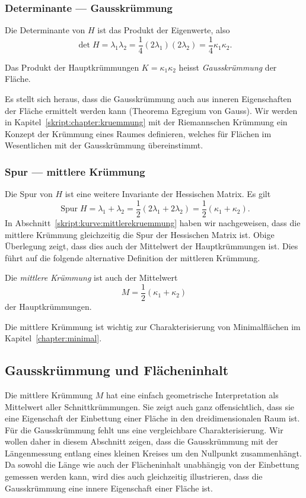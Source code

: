 \subsubsection{Determinante --- Gausskrümmung}
%
%
%
Die Determinante von $H$ ist das Produkt der Eigenwerte, also
\[
\det H
=
\lambda_1\lambda_2
=
\frac14 (2\lambda_1) (2\lambda_2)
=
\frac14 \kappa_1\kappa_2.
\]
\begin{definition}
\label{skript:definition:gausskruemmung}
Das Produkt der Hauptkrümmungen $K=\kappa_1\kappa_2$
heisst {\em Gausskrümmung} der Fläche.
\end{definition}
Es stellt sich heraus, dass die Gausskrümmung auch aus inneren Eigenschaften
der Fläche ermittelt werden kann
(Theorema Egregium von Gauss).
Wir werden in Kapitel~\ref{skript:chapter:kruemmung} 
mit der Riemannschen Krümmung ein Konzept der Krümmung eines Raumes
definieren, welches für Flächen im Wesentlichen mit der Gausskrümmung
übereinstimmt.

\subsubsection{Spur --- mittlere Krümmung}
%
%
%
Die Spur von $H$ ist eine weitere Invariante der Hessischen Matrix.
Es gilt
\[
\operatorname{Spur} H
=
\lambda_1+\lambda_2
=
\frac12(2\lambda_1+2\lambda_2)
=
\frac12(\kappa_1+\kappa_2).
\]
In Abschnitt~\ref{skript:kurve:mittlerekruemmung} haben wir nachgeweisen,
dass die mittlere Krümmung gleichzeitig die Spur der Hessischen Matrix ist.
Obige Überlegung zeigt, dass dies auch der Mittelwert der Hauptkrümmungen ist.
Dies führt auf die folgende alternative Definition der mittleren Krümmung.

\begin{definition}
\label{skript:definition:mittlerekruemmung2}
Die {\em mittlere Krümmung} ist auch der Mittelwert
\[
M=\frac12(\kappa_1+\kappa_2)
\]
der Hauptkrümmungen.
\end{definition}
Die mittlere Krümmung ist wichtig zur Charakterisierung von Minimalflächen
im Kapitel~\ref{chapter:minimal}.

\subsection{Gausskrümmung und Flächeninhalt%
\label{skript:kurven:gaussflaeche}}
Die mittlere Krümmung $M$ hat eine einfach geometrische Interpretation
als Mittelwert aller Schnittkrümmungen.
Sie zeigt auch ganz offensichtlich, dass sie eine Eigenschaft der Einbettung
einer Fläche in den dreidimensionalen Raum ist.
Für die Gausskrümmung fehlt uns eine vergleichbare Charakterisierung.
Wir wollen daher in diesem Abschnitt zeigen, dass die Gausskrümmung
mit der Längenmessung entlang eines kleinen Kreises um den Nullpunkt
zusammenhängt.
Da sowohl die Länge wie auch der Flächeninhalt unabhängig von der
Einbettung gemessen werden kann,
wird dies auch gleichzeitig illustrieren, dass die Gausskrümmung eine
innere Eigenschaft einer Fläche ist.

